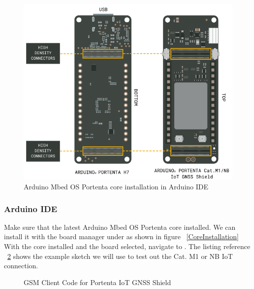 \begin{figure}
	\begin{center}
		\includegraphics[width=0.7\linewidth]{Images/PotentaIoTGNSSShield/BoardShieldHDConnectors.png}
		\caption{Arduino Mbed OS Portenta core installation in Arduino IDE}
		\label{BoardShieldConnection}
	\end{center}
\end{figure}

\subsubsection{Arduino IDE}
Make sure that the latest Arduino Mbed OS Portenta core installed. We can install it with the board manager under  as shown in figure ~\ref{CoreInstallation} With the core installed and the board selected, navigate to . The listing reference ~\ref{lst:GSMclientCode} shows the example sketch we will use to test out the Cat. M1 or NB IoT connection. \cite{ArduinoPortentaSketch:2024}

\begin{figure}[h]
	\centering
	
	\caption{GSM Client Code for Portenta IoT GNSS Shield}
	\label{lst:GSMclientCode}
\end{figure}


